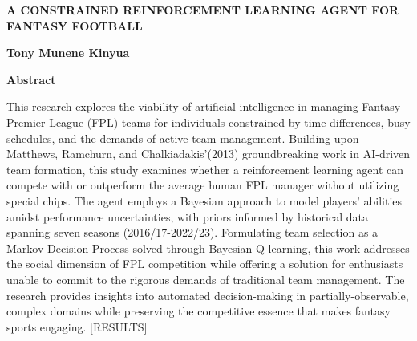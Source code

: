 \thispagestyle{plain}
\begin{center}
    \Large
    \textbf{A CONSTRAINED REINFORCEMENT LEARNING AGENT FOR FANTASY FOOTBALL}
    
    \vspace{0.4cm}
    \large
    
    \vspace{0.4cm}
    \textbf{Tony Munene Kinyua}
    
    \vspace{0.9cm}
    \textbf{Abstract}
\end{center}

This research explores the viability of artificial intelligence in managing Fantasy Premier League (FPL) teams for individuals constrained by time differences, busy schedules, and the demands of active team management. Building upon Matthews, Ramchurn, and Chalkiadakis'(2013) groundbreaking work in AI-driven team formation, this study examines whether a reinforcement learning agent can compete with or outperform the average human FPL manager without utilizing special chips. The agent employs a Bayesian approach to model players' abilities amidst performance uncertainties, with priors informed by historical data spanning seven seasons (2016/17-2022/23). Formulating team selection as a Markov Decision Process solved through Bayesian Q-learning, this work addresses the social dimension of FPL competition while offering a solution for enthusiasts unable to commit to the rigorous demands of traditional team management. The research provides insights into automated decision-making in partially-observable, complex domains while preserving the competitive essence that makes fantasy sports engaging. [RESULTS]